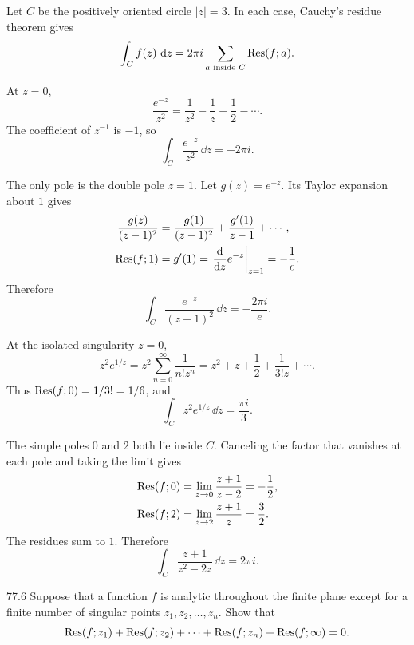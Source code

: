 \documentclass[11pt,oneside]{article}
\begin{document}
\begin{solution}
Let $C$ be the positively oriented circle $|z|=3$. In each case, Cauchy's residue theorem gives
\[
    \int_C f(z)\,\mathop{}\!\mathrm{d} z=2\pi i\sum_{a\text{ inside }C}\operatorname{Res}(f; a).
\]
\begin{exercisesubparts}
    \item At $z=0$,
    \[
        \frac{e^{-z}}{z^2}
        =\frac1{z^2}-\frac1z+\frac12-\cdots.
    \]
    The coefficient of $z^{-1}$ is $-1$, so
    \[
        \boxed{\int_C\frac{e^{-z}}{z^2}\,\dd z=-2\pi i.}
    \]

    \item The only pole is the double pole $z=1$. Let $g(z)=e^{-z}$. Its Taylor expansion about $1$ gives
    \[
    \begin{aligned}
        \frac{g(z)}{(z-1)^2}
        &=\frac{g(1)}{(z-1)^2}+\frac{g'(1)}{z-1}+\cdots,\\
        \operatorname{Res}(f; 1)&=g'(1)
        =\left.\frac{\mathop{}\!\mathrm{d}}{\mathop{}\!\mathrm{d} z}e^{-z}\right|_{z=1}
        =-\frac1e.
    \end{aligned}
    \]
    Therefore
    \[
        \boxed{\int_C\frac{e^{-z}}{(z-1)^2}\,\dd z=-\frac{2\pi i}{e}.}
    \]

    \item At the isolated singularity $z=0$,
    \[
        z^2e^{1/z}
        =z^2\sum_{n=0}^{\infty}\frac1{n!z^n}
        =z^2+z+\frac12+\frac1{3!z}+\cdots.
    \]
    Thus $\operatorname{Res}(f; 0)=1/3!=1/6$, and
    \[
        \boxed{\int_C z^2e^{1/z}\,\dd z=\frac{\pi i}{3}.}
    \]

    \item The simple poles $0$ and $2$ both lie inside $C$. Canceling the factor that vanishes at each pole and taking the limit gives
    \[
    \begin{aligned}
        \operatorname{Res}(f; 0)&=\displaystyle\lim_{z\to0}\frac{z+1}{z-2}=-\frac12,\\
        \operatorname{Res}(f; 2)&=\displaystyle\lim_{z\to2}\frac{z+1}{z}=\frac32.
    \end{aligned}
    \]
    The residues sum to $1$. Therefore
    \[
        \boxed{\int_C\frac{z+1}{z^2-2z}\,\dd z=2\pi i.}
    \]
\end{exercisesubparts}
\end{solution}

\begin{exercise}{77.6}
Suppose that a function $f$ is analytic throughout the finite plane except for a finite number of singular points $z_1, z_2, \ldots, z_n$. Show that
\[
    \operatorname{Res}(f; z_1)+\operatorname{Res}(f; z_2)+\cdots+\operatorname{Res}(f; z_n)+\operatorname{Res}(f; \infty)=0.
\]
\end{exercise}
\end{document}
